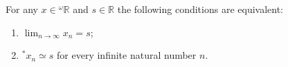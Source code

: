 For any $x \in {}^\omega\mathbb{R}$ and $s \in \mathbb{R}$ the following conditions are equivalent:
\begin{enumerate}
\item[(i)] $\displaystyle\lim_{n \to \infty} x_n = s$;
\item[(ii)] $^*x_n \simeq s$ for every infinite natural number $n$.
\end{enumerate}
